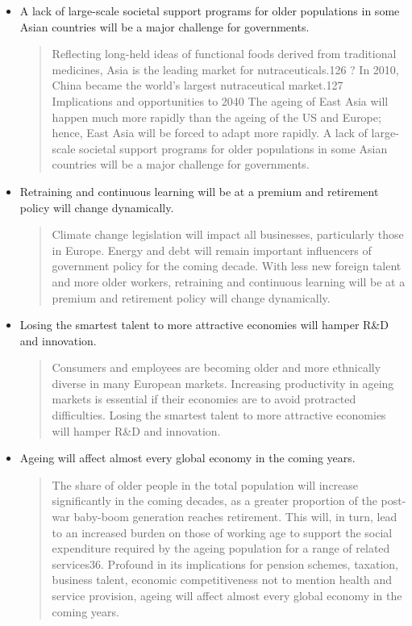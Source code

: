 \begin{itemize}
\item A lack of large-scale societal support programs for older populations in some Asian countries will be a major challenge for governments.
\begin{quotation}
Reflecting long-held ideas of functional foods derived from traditional medicines, Asia is the leading market for nutraceuticals.126 ? In 2010, China became the world's largest nutraceutical market.127 Implications and opportunities to 2040 The ageing of East Asia will happen much more rapidly than the ageing of the US and Europe; hence, East Asia will be forced to adapt more rapidly. A lack of large-scale societal support programs for older populations in some Asian countries will be a major challenge for governments.
\end{quotation}
\item Retraining and continuous learning will be at a premium and retirement policy will change dynamically.
\begin{quotation}
Climate change legislation will impact all businesses, particularly those in Europe. Energy and debt will remain important influencers of government policy for the coming decade. With less new foreign talent and more older workers, retraining and continuous learning will be at a premium and retirement policy will change dynamically.
\end{quotation}
\item Losing the smartest talent to more attractive economies will hamper R\&D and innovation.
\begin{quotation}
Consumers and employees are becoming older and more ethnically diverse in many European markets. Increasing productivity in ageing markets is essential if their economies are to avoid protracted difficulties. Losing the smartest talent to more attractive economies will hamper R\&D and innovation.
\end{quotation}
\item Ageing will affect almost every global economy in the coming years.
\begin{quotation}The share of older people in the total population will increase significantly in the coming decades, as a greater proportion of the post-war baby-boom generation reaches retirement. This will, in turn, lead to an increased burden on those of working age to support the social expenditure required by the ageing population for a range of related services36. Profound in its implications for pension schemes, taxation, business talent, economic competitiveness not to mention health and service provision, ageing will affect almost every global economy in the coming years.\end{quotation}

\end{itemize}
